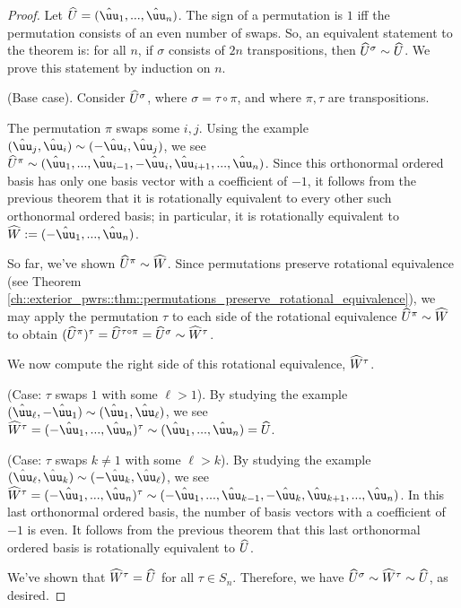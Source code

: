 \begin{proof}
    Let $\hU = (\huu_1, ..., \huu_n)$. The sign of a permutation is $1$ iff the permutation consists of an even number of swaps. So, an equivalent statement to the theorem is: for all $n$, if $\sigma$ consists of $2n$ transpositions, then $\widehat{U}^\sigma \sim \widehat{U}$. We prove this statement by induction on $n$.
    
    (Base case). Consider $\widehat{U}^\sigma$, where $\sigma = \tau \circ \pi$, and where $\pi, \tau$ are transpositions. 
    
    The permutation $\pi$ swaps some $i, j$. Using the example $(\huu_j, \huu_i) \sim (-\huu_i, \huu_j)$, we see \\ $\hU^\pi \sim (\huu_1, ..., \huu_{i - 1}, -\huu_i, \huu_{i + 1}, ..., \huu_n)$. Since this orthonormal ordered basis has only one basis vector with a coefficient of $-1$, it follows from the previous theorem that it is rotationally equivalent to every other such orthonormal ordered basis; in particular, it is rotationally equivalent to $\hW :=  (-\huu_1, ..., \huu_n)$.

    So far, we've shown $\widehat{U}^\pi \sim \widehat{W}$. Since permutations preserve rotational equivalence (see Theorem \ref{ch::exterior_pwrs::thm::permutations_preserve_rotational_equivalence}), we may apply the permutation $\tau$ to each side of the rotational equivalence $\widehat{U}^\pi \sim \widehat{W}$ to obtain $(\widehat{U}^\pi)^\tau = \widehat{U}^{\tau \circ \pi}  = \widehat{U}^\sigma \sim \widehat{W}^\tau$.

    We now compute the right side of this rotational equivalence, $\widehat{W}^\tau$.
    
    \indent \indent (Case: $\tau$ swaps $1$ with some $\ell > 1$). By studying the example $(\huu_\ell, -\huu_1) \sim (\huu_1, \huu_\ell)$, we see $\hW^\tau = (-\huu_1, ..., \huu_n)^\tau \sim (\huu_1, ..., \huu_n) = \hU$.
    
    \indent \indent (Case: $\tau$ swaps $k \neq 1$ with some $\ell > k$). By studying the example $(\huu_\ell, \huu_k) \sim (-\huu_k, \huu_\ell)$, we see $\hW^\tau = (-\huu_1, ..., \huu_n)^\tau \sim (-\huu_1, ..., \huu_{k - 1}, -\huu_k, \huu_{k + 1}, ..., \huu_n)$. In this last orthonormal ordered basis, the number of basis vectors with a coefficient of $-1$ is even. It follows from the previous theorem that this last orthonormal ordered basis is rotationally equivalent to $\widehat{U}$.

    We've shown that $\widehat{W}^\tau = \widehat{U}$ for all $\tau \in S_n$. Therefore, we have $\widehat{U}^\sigma \sim \widehat{W}^\tau \sim \widehat{U}$, as desired.
    

\end{proof}

